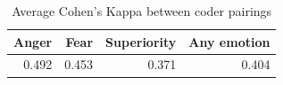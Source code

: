 \begin{table}[ht]
    \centering
\begin{tabular}{|r|r|r|r|}
\hline
\textbf{Anger} & \textbf{Fear} & \textbf{Superiority} & \textbf{Any emotion} \\
\hline
0.492 & 0.453 & 0.371 & 0.404 \\
\hline
\end{tabular}
    \caption{Average Cohen's Kappa between coder pairings}
    \label{tab:cohens_kappa}
\end{table}
